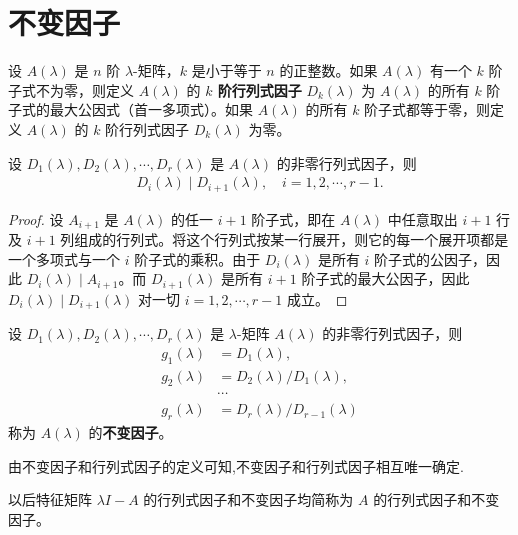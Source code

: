 \documentclass[../../main.tex]{subfiles}%
\begin{document}
\section{不变因子}

\begin{definition}[$k$阶行列式因子]
设 $A(\lambda)$ 是 $n$ 阶 $\lambda$-矩阵，$k$ 是小于等于 $n$ 的正整数。如果 $A(\lambda)$ 有一个 $k$ 阶子式不为零，则定义 $A(\lambda)$ 的 \textbf{$k$ 阶行列式因子} $D_k(\lambda)$ 为 $A(\lambda)$ 的所有 $k$ 阶子式的最大公因式（首一多项式）。如果 $A(\lambda)$ 的所有 $k$ 阶子式都等于零，则定义 $A(\lambda)$ 的 $k$ 阶行列式因子 $D_k(\lambda)$ 为零。 
\end{definition}

\begin{lemma}\label{lemma:i阶行列式因子整除i+1阶行列式因子}
设 $D_1(\lambda), D_2(\lambda), \cdots, D_r(\lambda)$ 是 $A(\lambda)$ 的非零行列式因子，则
\begin{align*}
D_i(\lambda)\mid D_{i + 1}(\lambda),\quad i = 1, 2, \cdots, r - 1.
\end{align*}
\end{lemma}
\begin{proof}
设 $A_{i + 1}$ 是 $A(\lambda)$ 的任一 $i + 1$ 阶子式，即在 $A(\lambda)$ 中任意取出 $i + 1$ 行及 $i + 1$ 列组成的行列式。将这个行列式按某一行展开，则它的每一个展开项都是一个多项式与一个 $i$ 阶子式的乘积。由于 $D_i(\lambda)$ 是所有 $i$ 阶子式的公因子，因此 $D_i(\lambda)\mid A_{i + 1}$。而 $D_{i + 1}(\lambda)$ 是所有 $i + 1$ 阶子式的最大公因子，因此 $D_i(\lambda)\mid D_{i + 1}(\lambda)$ 对一切 $i = 1, 2, \cdots, r - 1$ 成立。 
\end{proof}

\begin{definition}[不变因子]
设 $D_1(\lambda), D_2(\lambda), \cdots, D_r(\lambda)$ 是 $\lambda$-矩阵 $A(\lambda)$ 的非零行列式因子，则
\begin{align*}
g_1(\lambda)&=D_1(\lambda),\\
g_2(\lambda)&=D_2(\lambda)/D_1(\lambda),\\
&\cdots\\
g_r(\lambda)&=D_r(\lambda)/D_{r - 1}(\lambda)
\end{align*}
称为 $A(\lambda)$ 的\textbf{不变因子}。 
\end{definition}
\begin{note}
由不变因子和行列式因子的定义可知,不变因子和行列式因子相互唯一确定.
\end{note}
\begin{remark}
以后特征矩阵 $\lambda I - A$ 的行列式因子和不变因子均简称为 $A$ 的行列式因子和不变因子。 
\end{remark}
\end{document}
